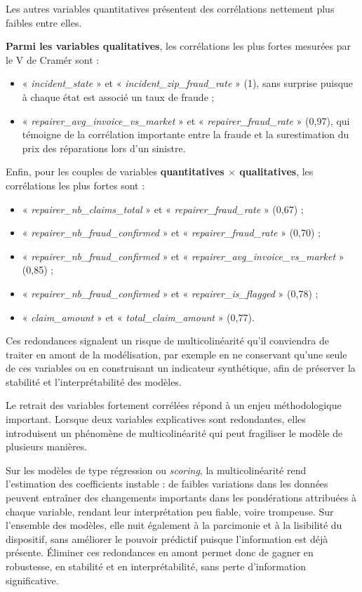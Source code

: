 Les autres variables quantitatives présentent des corrélations nettement plus faibles entre elles.

\noindent\textbf{Parmi les variables qualitatives}, les corrélations les plus fortes mesurées par le V de Cramér sont :

\begin{itemize}[label=$\bullet$]
    \item « \textit{incident\_state} » et « \textit{incident\_zip\_fraud\_rate} » (1), sans surprise puisque à chaque état est associé un taux de fraude ;
    \item « \textit{repairer\_avg\_invoice\_vs\_market} » et « \textit{repairer\_fraud\_rate} » (0,97), qui témoigne de la corrélation importante entre la fraude et la surestimation du prix des réparations lors d'un sinistre.
\end{itemize}

Enfin, pour les couples de variables \textbf{quantitatives $\times$ qualitatives}, les corrélations les plus fortes sont :

\begin{itemize}[label=$\bullet$]
    \item « \textit{repairer\_nb\_claims\_total} » et « \textit{repairer\_fraud\_rate} » (0,67) ;
    \item « \textit{repairer\_nb\_fraud\_confirmed} » et « \textit{repairer\_fraud\_rate} » (0,70) ;
    \item « \textit{repairer\_nb\_fraud\_confirmed} » et « \textit{repairer\_avg\_invoice\_vs\_market} » (0,85) ;
    \item « \textit{repairer\_nb\_fraud\_confirmed} » et « \textit{repairer\_is\_flagged} » (0,78) ;
    \item « \textit{claim\_amount} » et « \textit{total\_claim\_amount} » (0,77).
\end{itemize}

Ces redondances signalent un risque de multicolinéarité qu'il conviendra de traiter en amont de la modélisation, par exemple en ne conservant qu'une seule de ces variables ou en construisant un indicateur synthétique, afin de préserver la stabilité et l'interprétabilité des modèles.

Le retrait des variables fortement corrélées répond à un enjeu méthodologique important. Lorsque deux variables explicatives sont redondantes, elles introduisent un phénomène de multicolinéarité qui peut fragiliser le modèle de plusieurs manières.

Sur les modèles de type régression ou \textit{scoring}, la multicolinéarité rend l'estimation des coefficients instable : de faibles variations dans les données peuvent entraîner des changements importants dans les pondérations attribuées à chaque variable, rendant leur interprétation peu fiable, voire trompeuse. Sur l'ensemble des modèles, elle nuit également à la parcimonie et à la lisibilité du dispositif, sans améliorer le pouvoir prédictif puisque l'information est déjà présente. Éliminer ces redondances en amont permet donc de gagner en robustesse, en stabilité et en interprétabilité, sans perte d'information significative.


